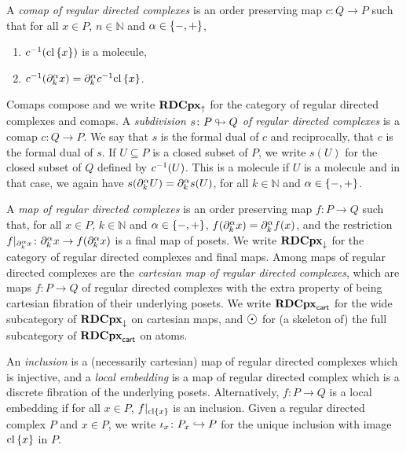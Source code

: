 A \emph{comap of regular directed complexes} is an order preserving map \( c \colon Q \to P \) such that for all \( x \in P \), \( n \in \mathbb{N} \) and \( \alpha \in \left\{ {-, +} \right\} \), 
\begin{enumerate}
    \item \( c^{-1}(\mathrm{cl}\left\{ {x} \right\}) \) is a molecule, 
    \item \( c^{-1}(\partial_{k}^{\alpha} x) = \partial_{k}^{\alpha} c^{-1}\mathrm{cl}\left\{ {x} \right\} \).
\end{enumerate}
Comaps compose and we write \( \mathbf{RDCpx}_{\uparrow} \) for the category of regular directed complexes and comaps.
A \emph{subdivision \( s \colon P \looparrowright Q \) of regular directed complexes} is a comap \( c \colon Q \to P \).
We say that \( s \) is the formal dual of \( c \) and reciprocally, that \( c \) is the formal dual of \( s \).
If \( U \subseteq P \) is a closed subset of \( P \), we write \( s(U) \) for the closed subset of \( Q \) defined by \( c^{-1}(U) \).
This is a molecule if \( U \) is a molecule and in that case, we again have \( s(\partial_{k}^{\alpha} U) = \partial_{k}^{\alpha} s(U) \), for all \( k \in \mathbb{N} \) and \( \alpha \in \left\{ {-, +} \right\} \).

A \emph{map of regular directed complexes} is an order preserving map \( f \colon P \to Q \) such that, for all \( x \in P \), \( k \in \mathbb{N} \) and \( \alpha \in \left\{ {-, +} \right\} \), \( f(\partial_{k}^{\alpha}x) = \partial_{k}^{\alpha} f(x) \), and the restriction \( \restr{f}{\bd{k}{\a} x} \colon \bd{k}{\a} x \to f(\bd{k}{\a} x) \) is a final map of posets. 
We write \( \mathbf{RDCpx}_{\downarrow} \) for the category of regular directed complexes and final maps.
Among maps of regular directed complexes are the \emph{cartesian map of regular directed complexes}, which are maps \( f \colon P \to Q \) of regular directed complexes with the extra property of being cartesian fibration of their underlying posets.
We write \( \mathbf{RDCpx}_{\mathsf{cart}} \) for the wide subcategory of \( \mathbf{RDCpx}_{\downarrow} \) on cartesian maps, and \( \atom \) for (a skeleton of) the full subcategory of \( \mathbf{RDCpx}_{\mathsf{cart}} \) on atoms.

An \emph{inclusion} is a (necessarily cartesian) map of regular directed complexes which is injective, and a \emph{local embedding} is a map of regular directed complex which is a discrete fibration of the underlying posets.
Alternatively, \( f \colon P \to Q \) is a local embedding if for all \( x \in P \), \( \restr{f}{\clset{x}} \) is an inclusion.
Given a regular directed complex \( P \) and \( x \in P \), we write \( \iota_{x} \colon {P}_{x} \hookrightarrow P \) for the unique inclusion with image \( \mathrm{cl}\left\{ {x} \right\} \) in \( P \).

